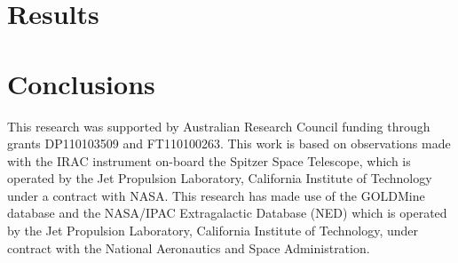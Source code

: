 \documentclass[preprint2]{emulateapj}
\begin{document}
\section{Results}
\label{sec:res}



\section{Conclusions}
\label{sec:concl}



\acknowledgments
This research was supported by Australian Research Council funding through grants
DP110103509 and FT110100263.
This work is based on observations made with the IRAC instrument \citep{fazio2004IRAC} 
on-board the Spitzer Space Telescope, 
which is operated by the Jet Propulsion Laboratory, 
California Institute of Technology under a contract with NASA.
This research has made use of the GOLDMine database \citep{goldmine} and the NASA/IPAC Extragalactic Database (NED) 
which is operated by the Jet Propulsion Laboratory, California Institute of Technology, 
under contract with the National Aeronautics and Space Administration. 





\clearpage
\end{document}

